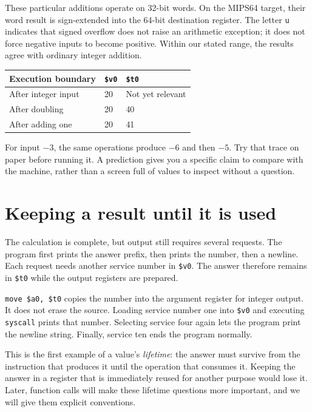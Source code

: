 These particular additions operate on 32-bit words. On the MIPS64 target, their
word result is sign-extended into the 64-bit destination register. The letter
\texttt{u} indicates that signed overflow does not raise an arithmetic exception;
it does not force negative inputs to become positive. Within our stated range,
the results agree with ordinary integer addition.

\begin{center}
  \begin{tabular}{lll}
    \toprule
    Execution boundary  & \texttt{\$v0} & \texttt{\$t0}    \\
    \midrule
    After integer input & 20            & Not yet relevant \\
    After doubling      & 20            & 40               \\
    After adding one    & 20            & 41               \\
    \bottomrule
  \end{tabular}
\end{center}

For input $-3$, the same operations produce $-6$ and then $-5$. Try that trace on
paper before running it. A prediction gives you a specific claim to compare with
the machine, rather than a screen full of values to inspect without a question.

\section{Keeping a result until it is used}

The calculation is complete, but output still requires several requests. The
program first prints the answer prefix, then prints the number, then a newline.
Each request needs another service number in \texttt{\$v0}. The answer therefore
remains in \texttt{\$t0} while the output registers are prepared.

\texttt{move \$a0, \$t0} copies the number into the argument register for integer
output. It does not erase the source. Loading service number one into
\texttt{\$v0} and executing \texttt{syscall} prints that number. Selecting service
four again lets the program print the newline string. Finally, service ten ends
the program normally.

This is the first example of a value's \emph{lifetime}: the answer must survive
from the instruction that produces it until the operation that consumes it.
Keeping the answer in a register that is immediately reused for another purpose
would lose it. Later, function calls will make these lifetime questions more
important, and we will give them explicit conventions.

